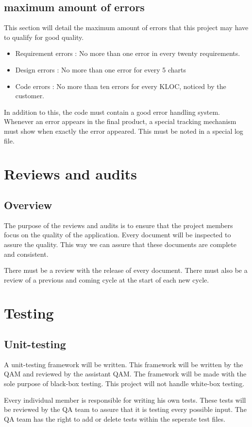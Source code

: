 \documentclass[salesmen, twoside]{../../../templates/latex/2009/softproj}
\begin{document}
\begin{projdoc}
\section{maximum amount of errors}
This section will detail the maximum amount of errors that this project may have to qualify for good quality.
\begin{itemize}
\item Requirement errors : No more than one error in every twenty requirements.
\item Design errors : No more than one error for every 5 charts
\item Code errors : No more than ten errors for every KLOC, noticed by the customer.
\end{itemize}
In addition to this, the code must contain a good error handling system. Whenever an error appears in the final product, a special tracking mechanism must show when exactly the error appeared. This must be noted in a special log file.

\chapter{Reviews and audits}
\section{Overview}
The purpose of the reviews and audits is to ensure that the project members focus on the quality of the application. Every document will be inspected to assure the quality. This way we can assure that these documents are complete and consistent.

There must be a review with the release of every document. There must also be a review of a previous and coming cycle at the start of each new cycle.

\chapter{Testing}
\section{Unit-testing}
A unit-testing framework will be written. This framework will be written by the QAM and reviewed by the assistant QAM. The framework will be made with the sole purpose of black-box testing. This project will not handle white-box testing.

Every individual member is responsible for writing his own tests. These tests will be reviewed by the QA team to assure that it is testing every possible input. The QA team has the right to add or delete tests within the seperate test files.


\end{projdoc}
\end{document}
